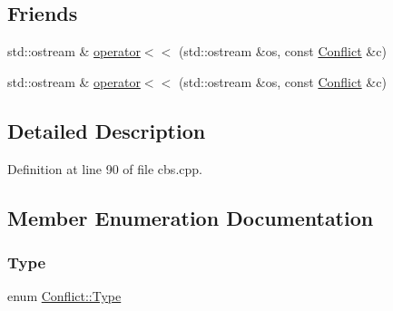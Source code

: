 \subsection*{Friends}
\begin{DoxyCompactItemize}
\item 
std\+::ostream \& \hyperlink{struct_conflict_a0fda4f63e0d8129b08d7b15bd2d6fb82}{operator$<$$<$} (std\+::ostream \&os, const \hyperlink{struct_conflict}{Conflict} \&c)
\item 
std\+::ostream \& \hyperlink{struct_conflict_a0fda4f63e0d8129b08d7b15bd2d6fb82}{operator$<$$<$} (std\+::ostream \&os, const \hyperlink{struct_conflict}{Conflict} \&c)
\end{DoxyCompactItemize}


\subsection{Detailed Description}


Definition at line 90 of file cbs.\+cpp.



\subsection{Member Enumeration Documentation}
\mbox{\label{struct_conflict_aee4228c4b31f415064213a2bbebe3eb6}} 
\subsubsection{\texorpdfstring{Type}{Type}\hspace{0.1cm}{\footnotesize\ttfamily [1/2]}}
{\footnotesize\ttfamily enum \hyperlink{struct_conflict_aee4228c4b31f415064213a2bbebe3eb6}{Conflict\+::\+Type}}

